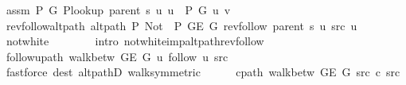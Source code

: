 \begin{isabellebody}
\ assm{\isacharcolon}{\kern0pt}\ {\isachardoublequoteopen}P{\isacharprime}{\kern0pt}\ G{}\ {\isacharparenleft}{\kern0pt}P{\isacharunderscore}{\kern0pt}lookup\ {\isacharparenleft}{\kern0pt}parent\ s{\isacharparenright}{\kern0pt}\ u{\isacharparenright}{\kern0pt}\ u\ {\isacharequal}{\kern0pt}\ P\ G{}\ u\ v{\isachardoublequoteclose}\isanewline
\ \ \ \ \isamarkupfalse%
\ rev{\isacharunderscore}{\kern0pt}follow{\isacharunderscore}{\kern0pt}alt{\isacharunderscore}{\kern0pt}path{\isacharcolon}{\kern0pt}\ {\isachardoublequoteopen}alt{\isacharunderscore}{\kern0pt}path\ P{\isacharprime}{\kern0pt}{\isacharprime}{\kern0pt}\ {\isacharparenleft}{\kern0pt}Not\ {\isasymcirc}\ P{\isacharprime}{\kern0pt}{\isacharprime}{\kern0pt}{\isacharparenright}{\kern0pt}\ {\isacharparenleft}{\kern0pt}G{\isachardot}{\kern0pt}E\ G{\isacharparenright}{\kern0pt}\ {\isacharparenleft}{\kern0pt}rev{\isacharunderscore}{\kern0pt}follow\ {\isacharparenleft}{\kern0pt}parent\ s{\isacharparenright}{\kern0pt}\ u{\isacharparenright}{\kern0pt}\ src\ u{\isachardoublequoteclose}\isanewline
\ \ \ \ \ \ \isamarkupfalse%
\ not{\isacharunderscore}{\kern0pt}white\isanewline
\ \ \ \ \ \ \isamarkupfalse%
\ {\isacharparenleft}{\kern0pt}intro\ not{\isacharunderscore}{\kern0pt}white{\isacharunderscore}{\kern0pt}imp{\isacharunderscore}{\kern0pt}alt{\isacharunderscore}{\kern0pt}path{\isacharunderscore}{\kern0pt}rev{\isacharunderscore}{\kern0pt}follow{\isacharparenright}{\kern0pt}\isanewline
\ \ \ \ \isamarkupfalse%
\ follow{\isacharunderscore}{\kern0pt}u{\isacharunderscore}{\kern0pt}path{\isacharcolon}{\kern0pt}\ {\isachardoublequoteopen}walk{\isacharunderscore}{\kern0pt}betw\ {\isacharparenleft}{\kern0pt}G{\isachardot}{\kern0pt}E\ G{\isacharparenright}{\kern0pt}\ u\ {\isacharparenleft}{\kern0pt}follow\ u{\isacharparenright}{\kern0pt}\ src{\isachardoublequoteclose}\isanewline
\ \ \ \ \ \ \isamarkupfalse%
\ {\isacharparenleft}{\kern0pt}fastforce\ dest{\isacharcolon}{\kern0pt}\ alt{\isacharunderscore}{\kern0pt}pathD{\isacharparenleft}{\kern0pt}{}{\isacharparenright}{\kern0pt}\ walk{\isacharunderscore}{\kern0pt}symmetric{\isacharparenright}{\kern0pt}\isanewline
\ \ \ \ \isamarkupfalse%
\ c{\isacharunderscore}{\kern0pt}path{\isacharcolon}{\kern0pt}\ {\isachardoublequoteopen}walk{\isacharunderscore}{\kern0pt}betw\ {\isacharparenleft}{\kern0pt}G{\isachardot}{\kern0pt}E\ G{\isacharparenright}{\kern0pt}\ src\ {\isacharquery}{\kern0pt}c\ src{\isachardoublequoteclose}\isanewline
\ \ \ \ \ \ \isamarkupfalse%

\end{isabellebody}
